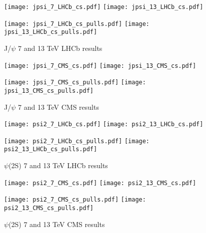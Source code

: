 \documentclass{article}
\begin{document}

\begin{figure}
\centering
\texttt{[image: jpsi\_7\_LHCb\_cs.pdf]}
\texttt{[image: jpsi\_13\_LHCb\_cs.pdf]}

\texttt{[image: jpsi\_7\_LHCb\_cs\_pulls.pdf]}
\texttt{[image: jpsi\_13\_LHCb\_cs\_pulls.pdf]}
\caption{J/$\psi$ 7 and 13 TeV LHCb results}
\end{figure}

\clearpage

\begin{figure}
\centering
\texttt{[image: jpsi\_7\_CMS\_cs.pdf]}
\texttt{[image: jpsi\_13\_CMS\_cs.pdf]}

\texttt{[image: jpsi\_7\_CMS\_cs\_pulls.pdf]}
\texttt{[image: jpsi\_13\_CMS\_cs\_pulls.pdf]}
\caption{J/$\psi$ 7 and 13 TeV CMS results}
\end{figure}

\clearpage

\begin{figure}
\centering
\texttt{[image: psi2\_7\_LHCb\_cs.pdf]}
\texttt{[image: psi2\_13\_LHCb\_cs.pdf]}

\texttt{[image: psi2\_7\_LHCb\_cs\_pulls.pdf]}
\texttt{[image: psi2\_13\_LHCb\_cs\_pulls.pdf]}
\caption{$\psi$(2S) 7 and 13 TeV LHCb results}
\end{figure}

\clearpage

\begin{figure}
\centering
\texttt{[image: psi2\_7\_CMS\_cs.pdf]}
\texttt{[image: psi2\_13\_CMS\_cs.pdf]}

\texttt{[image: psi2\_7\_CMS\_cs\_pulls.pdf]}
\texttt{[image: psi2\_13\_CMS\_cs\_pulls.pdf]}
\caption{$\psi$(2S) 7 and 13 TeV CMS results}
\end{figure}

\clearpage
\restoregeometry


\end{document}
